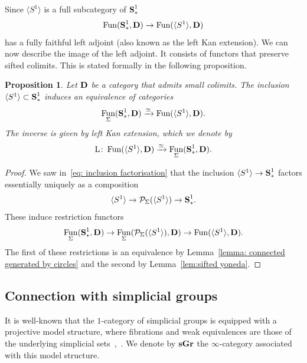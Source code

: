 \documentclass[psamsfonts]{amsart}
\theoremstyle{plain}
\newtheorem{prop}[thm]{Proposition}
\theoremstyle{definition}
\theoremstyle{remark}
\newcommand{\catname}[1]{{\normalfont\textbf{#1}}}
\newcommand{\circles}{\langle S^1 \rangle}
\newcommand{\spaces}{\catname{S}_*}
\newcommand{\connected}{\spaces^{1}}
\newcommand{\fr}{\allfr^{\mathrm{fg}}}
\newcommand{\allfr}{\catname{Fr}}
\newcommand{\presh}{\mathcal{P}}
\newcommand{\sgr}{\catname{sGr}}
\newcommand{\lkan}{\mathrm{L}}
\DeclareMathOperator{\fun}{Fun}
\begin{document}
Since $\circles$ is a full subcategory of $\connected$
\[
\fun(\connected, \catname{D}) \to \fun(\circles, \catname{D})
\]
has a fully faithful left adjoint (also known as the left Kan extension). We can now describe the image of the left adjoint. It consists of functors that preserve sifted colimits. This is stated formally in the following proposition.
\begin{prop}\label{prop:circles to connected}
Let $\catname{D}$ be a category that admits small colimits. The inclusion $\circles\subset \connected$ induces an equivalence of categories
\[
\fun_{\Sigma}(\connected, \catname{D}) \xrightarrow{\simeq} \fun(\circles, \catname{D}).
\]
The inverse is given by left Kan extension, which we denote by 
\[
\lkan\colon \fun(\circles, \catname{D})\xrightarrow{\simeq}  \fun_{\Sigma}(\connected, \catname{D}).
\]
\end{prop}
\begin{proof}
We saw in~\eqref{eq: inclusion factorisation} that the inclusion $\circles\to \connected$ factors essentially uniquely as a composition
\[
\circles \to \presh_{\Sigma}(\circles) \to \connected.
\]
These induce restriction functors
\[
\fun_{\Sigma}(\connected, \catname{D}) \to \fun_{\Sigma}(\presh_{\Sigma}(\circles), \catname{D}) \to \fun(\circles, \catname{D}).
\]
The first of these restrictions is an equivalence by Lemma~\ref{lemma: connected generated by circles} and the second by Lemma~\ref{lem:sifted yoneda}.
\end{proof}

\subsection{Connection with simplicial groups} 
It is well-known that the $1$-category of simplicial groups is equipped with a projective model structure, where fibrations and weak equivalences are those of the underlying simplicial sets~\cite{QuillenHA},~\cite[Chapter II, Example 5.2]{Goerss-Jardine}. We denote by $\sgr$ the $\infty$-category associated with this model structure.
\end{document}
